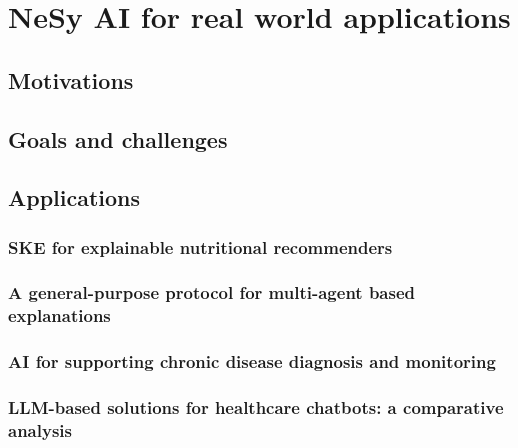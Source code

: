 
\chapter{NeSy AI for real world applications}
\label{ch:nesy-ai-for-real-world-applications}
\mtcaddchapter
\minitoc

\section{Motivations}\label{sec:nesy-ai-motivations}

\section{Goals and challenges}\label{sec:nesy-ai-goals-and-challenges}

\section{Applications}\label{sec:nesy-ai-applications}

\subsection{\Gls{SKE} for explainable nutritional recommenders}\label{subsec:ske-for-explainable-nutritional-recommenders}

\subsection{A general-purpose protocol for multi-agent based explanations}\label{subsec:a-general-purpose-protocol-for-multi-agent-based-explanations}

\subsection{ \Gls{AI} for supporting chronic disease diagnosis and monitoring}\label{subsec:nesy-ai-for-supporting-chronic-disease-diagnosis-and-monitoring}

\subsection{\Gls{LLM}-based solutions for healthcare chatbots: a comparative analysis}\label{subsec:llm-based-solutions-for-healthcare-chatbots-a-comparative-analysis}

